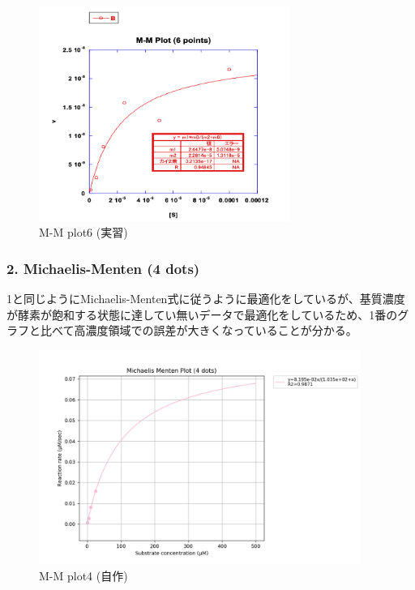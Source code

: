 \documentclass[a4paper,papersize,dvipdfmx]{jsarticle}
\begin{document}
\begin{figure}[H]
\begin{center}
\includegraphics[clip, height=7cm]{imgs/11-mm6.png}
\caption{M-M plot6 (実習)}
\end{center}
\end{figure}


\subsubsection*{2.  Michaelis-Menten (4 dots)}
1と同じようにMichaelis-Menten式に従うように最適化をしているが、基質濃度が酵素が飽和する状態に達してい無いデータで最適化をしているため、1番のグラフと比べて高濃度領域での誤差が大きくなっていることが分かる。

\begin{figure}[H]
\begin{center}
\includegraphics[clip, height=7cm]{imgs/MichaelisMenten4.png}
\caption{M-M plot4 (自作)}
\end{center}
\end{figure}
\end{document}

